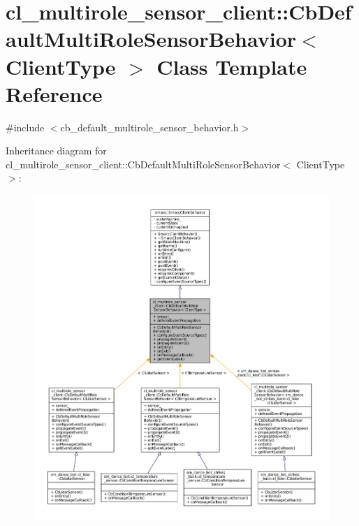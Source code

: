 \hypertarget{classcl__multirole__sensor__client_1_1CbDefaultMultiRoleSensorBehavior}{}\section{cl\+\_\+multirole\+\_\+sensor\+\_\+client\+:\+:Cb\+Default\+Multi\+Role\+Sensor\+Behavior$<$ Client\+Type $>$ Class Template Reference}
\label{classcl__multirole__sensor__client_1_1CbDefaultMultiRoleSensorBehavior}


{\ttfamily \#include $<$cb\+\_\+default\+\_\+multirole\+\_\+sensor\+\_\+behavior.\+h$>$}



Inheritance diagram for cl\+\_\+multirole\+\_\+sensor\+\_\+client\+:\+:Cb\+Default\+Multi\+Role\+Sensor\+Behavior$<$ Client\+Type $>$\+:
\nopagebreak
\begin{figure}[H]
\begin{center}
\leavevmode
\includegraphics[width=350pt]{classcl__multirole__sensor__client_1_1CbDefaultMultiRoleSensorBehavior__inherit__graph}
\end{center}
\end{figure}


